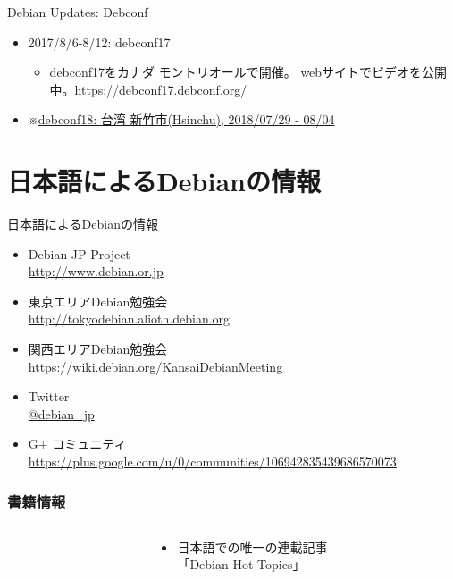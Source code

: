 \documentclass[cjk,c,squeeze,shrink,dvipdfmx,12pt]{beamer}
\begin{document}
\begin{frame}[fragile]{Debian Updates: Debconf}%
  \begin{itemize}[<+->]
  \item 2017/8/6-8/12:  debconf17
    \begin{itemize}
    \item
      debconf17をカナダ モントリオールで開催。
      webサイトでビデオを公開中。\url{https://debconf17.debconf.org/}
    \end{itemize}
  \item
    ※\uline{debconf18: 台湾 新竹市(Hsinchu), 2018/07/29 - 08/04}
  \end{itemize}
\end{frame}

\section{日本語によるDebianの情報}

\begin{frame}[fragile]{日本語によるDebianの情報}
  \begin{itemize}
  \item Debian JP Project \\
    \url{http://www.debian.or.jp}
  \item 東京エリアDebian勉強会\\
    \url{http://tokyodebian.alioth.debian.org}
  \item 関西エリアDebian勉強会 \\
    \url{https://wiki.debian.org/KansaiDebianMeeting}
  \item Twitter \\
    \url{@debian_jp}
  \item G+ コミュニティ \\
    \url{https://plus.google.com/u/0/communities/106942835439686570073}
  \end{itemize}
\end{frame}

\begin{frame}
  \frametitle{書籍情報}
  \begin{columns}
    \begin{column}{.5\paperwidth}
      \centering
    \end{column}
    \begin{column}{.5\paperwidth}
      \begin{itemize}
      \item %
        日本語での唯一の連載記事 \\
        「Debian Hot Topics」
      \end{itemize}
    \end{column}
  \end{columns}
\end{frame}
\end{document}
